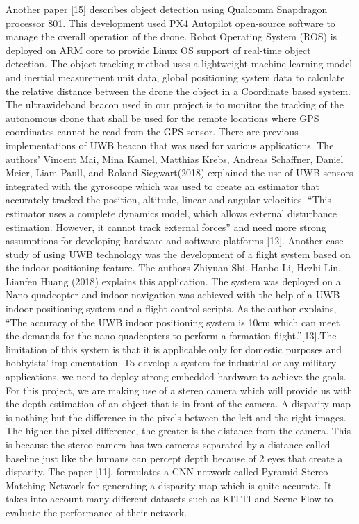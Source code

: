\documentclass{IEEEtran}
\begin{document}
\newline Another paper [15] describes object detection using Qualcomm Snapdragon processor 801.  This development used PX4 Autopilot open-source software to manage the overall operation of the drone. Robot Operating System (ROS) is deployed on ARM core to provide Linux OS support of real-time object detection. The object tracking method uses a lightweight machine learning model and inertial measurement unit data, global positioning system data to calculate the relative distance between the drone the object in a Coordinate based system.
The ultrawideband beacon used in our project is to monitor the tracking of the autonomous drone that shall be used for the remote locations where GPS coordinates cannot be read from the GPS sensor. There are previous implementations of UWB beacon that was used for various applications. The authors' Vincent Mai, Mina Kamel, Matthias Krebs, Andreas Schaffner, Daniel Meier, Liam Paull, and Roland Siegwart(2018) explained the use of UWB sensors integrated with the gyroscope which was used to create an estimator that accurately tracked the position, altitude, linear and angular velocities. “This estimator uses a complete dynamics model, which allows external disturbance estimation. However, it cannot track external forces” and need more strong assumptions for developing hardware and software platforms [12].
Another case study of using UWB technology was the development of a flight system based on the indoor positioning feature. The authors Zhiyuan Shi, Hanbo Li, Hezhi Lin, Lianfen Huang (2018) explains this application. The system was deployed on a Nano quadcopter and indoor navigation was achieved with the help of a UWB indoor positioning system and a flight control scripts. As the author explains, “The accuracy of the UWB indoor positioning system is 10cm which can meet the demands for the nano-quadcopters to perform a formation flight.”[13].The limitation of this system is that it is applicable only for domestic purposes and hobbyists' implementation. To develop a system for industrial or any military applications, we need to deploy strong embedded hardware to achieve the goals.
\newline For this project, we are making use of a stereo camera which will provide us with the depth estimation of an object that is in front of the camera. A disparity map is nothing but the difference in the pixels between the left and the right images. The higher the pixel difference, the greater is the distance from the camera. This is because the stereo camera has two cameras separated by a distance called baseline just like the humans can percept depth because of 2 eyes that create a disparity. The paper [11], formulates a CNN network called Pyramid Stereo Matching Network for generating a disparity map which is quite accurate. It takes into account many different datasets such as KITTI and Scene Flow to evaluate the performance of their network.
\end{document}
